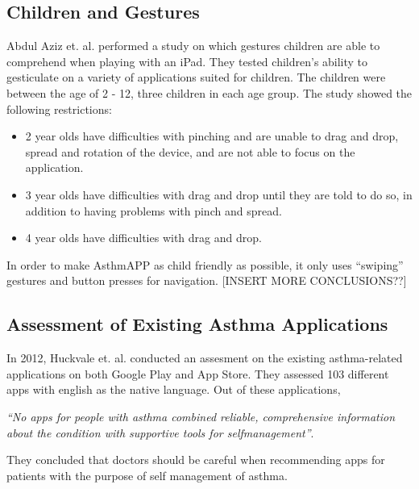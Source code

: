 \subsection{Children and Gestures}

Abdul Aziz et. al.\cite{aziz2013children} performed a study on which gestures children are able to comprehend when playing with an iPad. They tested children's ability to gesticulate on a variety of applications suited for children. The children were between the age of 2 - 12, three children in each age group. The study showed the following restrictions:

\begin{itemize}
  \item 2 year olds have difficulties with pinching and are unable to drag and drop, spread and rotation of the device, and are not able to focus on the application. 
  \item 3 year olds have difficulties with drag and drop until they are told to do so, in addition to having problems with pinch and spread. 
  \item 4 year olds have difficulties with drag and drop. 
\end{itemize}

In order to make AsthmAPP as child friendly as possible, it only uses ``swiping'' gestures and button presses for navigation.
[INSERT MORE CONCLUSIONS??]


\subsection{Assessment of Existing Asthma Applications}
In 2012, Huckvale et. al.\cite{huckvale2012apps} conducted an assesment on the existing asthma-related applications on both Google Play and App Store. They assessed 103 different apps with english as the native language. Out of these applications, 

\emph{``No apps for people with asthma combined reliable, comprehensive information about the condition with supportive tools for self­management''}\cite{huckvale2012apps}. 

They concluded that doctors should be careful when recommending apps for patients with the purpose of self management of asthma.